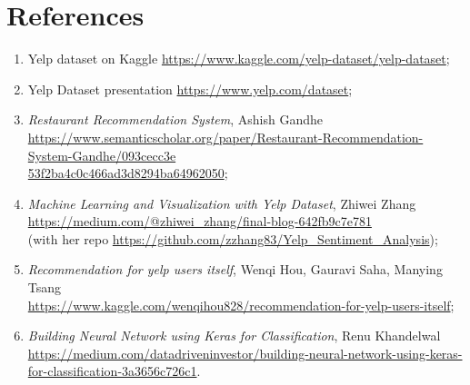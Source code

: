 
\section{References}



\begin{enumerate}
    \item Yelp dataset on Kaggle \href{https://www.kaggle.com/yelp-dataset/yelp-dataset}{https://www.kaggle.com/yelp-dataset/yelp-dataset};\label{yelp-kaggle}
    \item Yelp Dataset presentation \href{https://www.yelp.com/dataset}{https://www.yelp.com/dataset};
    \item \textit{Restaurant Recommendation System}, Ashish Gandhe \\ \href{https://www.semanticscholar.org/paper/Restaurant-Recommendation-System-Gandhe/093cecc3e53f2ba4c0c466ad3d8294ba64962050}{https://www.semanticscholar.org/paper/Restaurant-Recommendation-System-Gandhe/093cecc3e\\53f2ba4c0c466ad3d8294ba64962050}; \label{Gandhe}
    \item \textit{Machine Learning and Visualization with Yelp Dataset}, Zhiwei Zhang \\ \href{https://medium.com/@zhiwei_zhang/final-blog-642fb9c7e781}{https://medium.com/@zhiwei\_zhang/final-blog-642fb9c7e781} \\
    (with her repo \href{https://github.com/zzhang83/Yelp_Sentiment_Analysis}{https://github.com/zzhang83/Yelp\_Sentiment\_Analysis}); \label{Zhang}
    \item \textit{Recommendation for yelp users itself}, Wenqi Hou, Gauravi Saha, Manying Tsang \\ \href{https://www.kaggle.com/wenqihou828/recommendation-for-yelp-users-itself}{https://www.kaggle.com/wenqihou828/recommendation-for-yelp-users-itself}; \label{Hou}
    \item \textit{Building Neural Network using Keras for Classification}, Renu Khandelwal \\ \href{https://medium.com/datadriveninvestor/building-neural-network-using-keras-for-classification-3a3656c726c1}{https://medium.com/datadriveninvestor/building-neural-network-using-keras-\\for-classification-3a3656c726c1}.\label{Khandelwal}
\end{enumerate}



